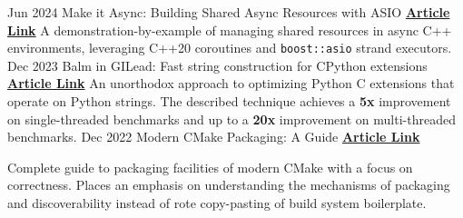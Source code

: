 \documentclass[9pt]{developercv} %
\begin{document}
\vspace{-10 pt}
\begin{entrylist}
	\entry
	{Jun 2024}
	{Make it Async: Building Shared Async Resources with ASIO}
	{
		{\href{https://blog.vito.nyc/posts/make-it-async/}{\textbf{Article Link}}}
	}
	{
		A demonstration-by-example of managing shared resources in async C++
		environments, leveraging C++20 coroutines and \texttt{boost::asio} strand
		executors.
	}
	\entry
	{Dec 2023}
	{Balm in GILead: Fast string construction for CPython extensions}
	{
		{\href{https://blog.vito.nyc/posts/gil-balm}{\textbf{Article Link}}}
	}
	{
		An unorthodox approach to optimizing Python C extensions that operate on
		Python strings. The described technique achieves a \textbf{5x} improvement
		on single-threaded benchmarks and up to a \textbf{20x} improvement on
		multi-threaded benchmarks.
	}
	\entry
	{Dec 2022}
	{Modern CMake Packaging: A Guide}
	{
		{\href{https://blog.vito.nyc/posts/cmake-pkg}{\textbf{Article Link}}}
	}
	{
		Complete guide to packaging facilities of modern CMake with a focus on
		correctness. Places an emphasis on understanding the mechanisms of
		packaging and discoverability instead of rote copy-pasting of build system
		boilerplate.

	}
\end{entrylist}

\end{document}
